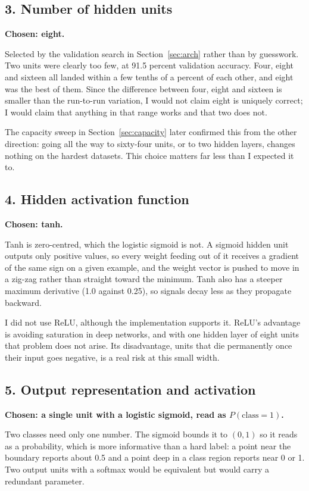 \documentclass[11pt]{article}
\begin{document}
\subsection*{3. Number of hidden units}
\textbf{Chosen: eight.}

Selected by the validation search in Section~\ref{sec:arch} rather than by
guesswork. Two units were clearly too few, at 91.5 percent validation accuracy.
Four, eight and sixteen all landed within a few tenths of a percent of each
other, and eight was the best of them. Since the difference between four,
eight and sixteen is smaller than the run-to-run variation, I would not claim
eight is uniquely correct; I would claim that anything in that range works and
that two does not.

The capacity sweep in Section~\ref{sec:capacity} later confirmed this from the
other direction: going all the way to sixty-four units, or to two hidden layers,
changes nothing on the hardest datasets. This choice matters far less than I
expected it to.

\subsection*{4. Hidden activation function}
\textbf{Chosen: tanh.}

Tanh is zero-centred, which the logistic sigmoid is not. A sigmoid hidden unit
outputs only positive values, so every weight feeding out of it receives a
gradient of the same sign on a given example, and the weight vector is pushed to
move in a zig-zag rather than straight toward the minimum. Tanh also has a
steeper maximum derivative (1.0 against 0.25), so signals decay less as they
propagate backward.

I did not use ReLU, although the implementation supports it. ReLU's advantage is
avoiding saturation in deep networks, and with one hidden layer of eight units
that problem does not arise. Its disadvantage, units that die permanently once
their input goes negative, is a real risk at this small width.

\subsection*{5. Output representation and activation}
\textbf{Chosen: a single unit with a logistic sigmoid, read as $P(\text{class}=1)$.}

Two classes need only one number. The sigmoid bounds it to $(0,1)$ so it reads
as a probability, which is more informative than a hard label: a point near the
boundary reports about 0.5 and a point deep in a class region reports near 0 or
1. Two output units with a softmax would be equivalent but would carry a
redundant parameter.
\end{document}
